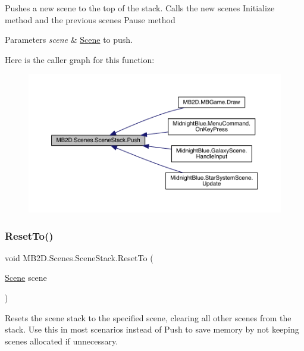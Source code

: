 Pushes a new scene to the top of the stack. Calls the new scenes Initialize method and the previous scenes Pause method 


\begin{DoxyParams}{Parameters}
{\em scene} & \hyperlink{class_m_b2_d_1_1_scenes_1_1_scene}{Scene} to push.\\
\hline
\end{DoxyParams}
Here is the caller graph for this function\+:\nopagebreak
\begin{figure}[H]
\begin{center}
\leavevmode
\includegraphics[width=350pt]{class_m_b2_d_1_1_scenes_1_1_scene_stack_a22760622453ac16621534bc324ec039f_icgraph}
\end{center}
\end{figure}
\hypertarget{class_m_b2_d_1_1_scenes_1_1_scene_stack_a521a38426d3e85caeb53b2909b623562}{}\label{class_m_b2_d_1_1_scenes_1_1_scene_stack_a521a38426d3e85caeb53b2909b623562} 
\subsubsection{\texorpdfstring{Reset\+To()}{ResetTo()}}
{\footnotesize\ttfamily void M\+B2\+D.\+Scenes.\+Scene\+Stack.\+Reset\+To (\begin{DoxyParamCaption}\item[{\hyperlink{class_m_b2_d_1_1_scenes_1_1_scene}{Scene}}]{scene }\end{DoxyParamCaption})\hspace{0.3cm}{\ttfamily [inline]}}



Resets the scene stack to the specified scene, clearing all other scenes from the stack. Use this in most scenarios instead of Push to save memory by not keeping scenes allocated if unnecessary. 



